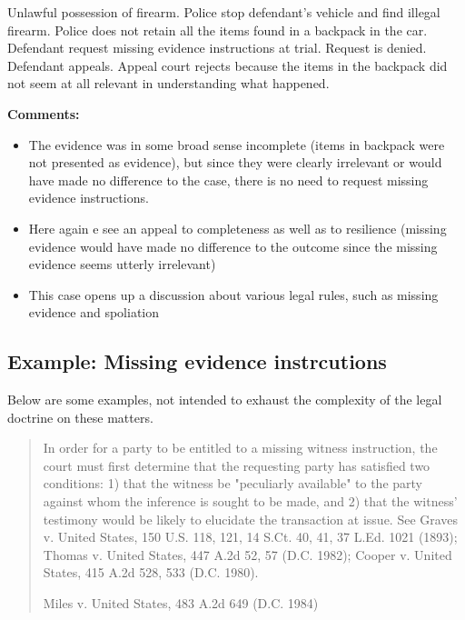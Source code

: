 \documentclass[
  10pt,
  dvipsnames,enabledeprecatedfontcommands]{scrartcl}
\begin{document}
Unlawful possession of firearm. Police stop defendant's vehicle and find
illegal firearm. Police does not retain all the items found in a
backpack in the car. Defendant request missing evidence instructions at
trial. Request is denied. Defendant appeals. Appeal court rejects
because the items in the backpack did not seem at all relevant in
understanding what happened.

\textbf{Comments:}

\begin{itemize}
\item
  The evidence was in some broad sense incomplete (items in backpack
  were not presented as evidence), but since they were clearly
  irrelevant or would have made no difference to the case, there is no
  need to request missing evidence instructions.
\item
  Here again e see an appeal to completeness as well as to resilience
  (missing evidence would have made no difference to the outcome since
  the missing evidence seems utterly irrelevant)
\item
  This case opens up a discussion about various legal rules, such as
  missing evidence and spoliation
\end{itemize}


\hypertarget{example-missing-evidence-instrcutions}{%
\subsection{Example: Missing evidence
instrcutions}\label{example-missing-evidence-instrcutions}}

Below are some examples, not intended to exhaust the complexity of the
legal doctrine on these matters.

\begin{quote}
In order for a party to be entitled to a missing witness instruction, the court must first determine that the requesting party has satisfied two conditions: 1) that the witness be "peculiarly available" to the party against whom the inference is sought to be made, and 2) that the witness' testimony would be likely to elucidate the transaction at issue. See Graves v. United States, 150 U.S. 118, 121, 14 S.Ct. 40, 41, 37 L.Ed. 1021 (1893); Thomas v. United States, 447 A.2d 52, 57 (D.C. 1982); Cooper  v. United States, 415 A.2d 528, 533 (D.C. 1980).

Miles v. United States, 483 A.2d 649 (D.C. 1984)
\end{quote}
\end{document}

